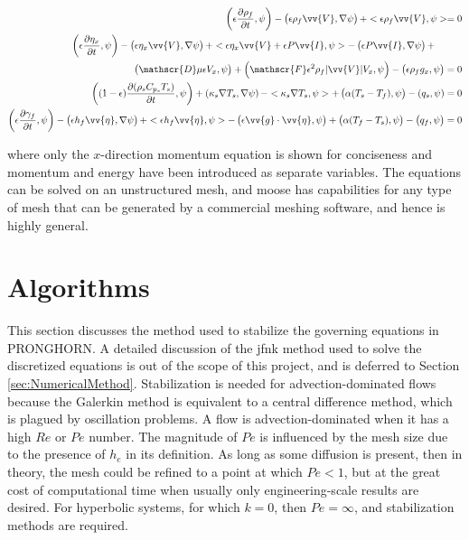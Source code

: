 \documentclass[10pt]{article}
\numberwithin{equation}{section} %
\begin{document}
\begin{equation}
\label{eq:PronghornEquations_V2WeakForm}
\begin{aligned}
\left(\epsilon \frac{\partial\rho_f}{\partial t},\psi\right)-\left(\epsilon\rho_f\vv{V},\nabla\psi\right)+< \epsilon\rho_f\vv{V},\psi>=0\\
\left(\epsilon\frac{\partial\eta_x}{\partial t},\psi\right)-\left(\epsilon\eta_x\vv{V},\nabla\psi\right)+<\epsilon\eta_x\vv{V} + \epsilon P\vv{I},\psi>-\left(\epsilon P\vv{I},\nabla\psi\right)+\hspace{1cm}\\
\left(\mathscr{D}\mu\epsilon V_x,\psi\right)+\left(\mathscr{F}\epsilon^2\rho_f|\vv{V}|V_x,\psi\right)-\left(\epsilon\rho_f g_x,\psi\right)=0\\
\left((1-\epsilon)\frac{\partial(\rho_s C_{p_s}T_s)}{\partial t},\psi\right)+\left(\kappa_s\nabla T_s,\nabla\psi\right)-<\kappa_s\nabla T_s,\psi>+\left(\alpha(T_s-T_f),\psi\right)-\left(q_s,\psi\right)=0\\
\left(\epsilon\frac{\partial\gamma_f}{\partial t},\psi\right)-\left(\epsilon h_f\vv{\eta},\nabla\psi\right)+<\epsilon h_f\vv{\eta},\psi>-\left(\epsilon\vv{g}\cdot\vv{\eta},\psi\right)+\left(\alpha(T_f-T_s),\psi\right)-\left(q_f,\psi\right)=0\\
\end{aligned}
\end{equation}

where only the \(x\)-direction momentum equation is shown for conciseness and momentum and energy have been introduced as separate variables. The equations can be solved on an unstructured mesh, and \gls{moose} has capabilities for any type of mesh that can be generated by a commercial meshing software, and hence is highly general.

\section{Algorithms}

This section discusses the method used to stabilize the governing equations in PRONGHORN. A detailed discussion of the \gls{jfnk} method used to solve the discretized equations is out of the scope of this project, and is deferred to Section \ref{sec:NumericalMethod}. Stabilization is needed for advection-dominated flows because the Galerkin method is equivalent to a central difference method, which is plagued by oscillation problems. A flow is advection-dominated when it has a high \(Re\) or \(Pe\) number. The magnitude of \(Pe\) is influenced by the mesh size due to the presence of \(h_e\) in its definition. As long as some diffusion is present, then in theory, the mesh could be refined to a point at which \(Pe<1\), but at the great cost of computational time when usually only engineering-scale results are desired. For hyperbolic systems, for which \(k=0\), then \(Pe=\infty\), and stabilization methods are required. 
\end{document}

